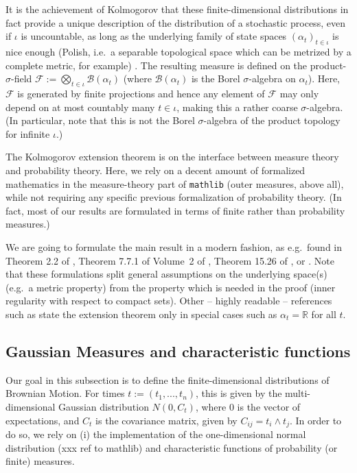 \documentclass[lean]{DraftAFM}
\begin{document}
It is the achievement of Kolmogorov that these finite-dimensional distributions in fact provide a unique description of the distribution of a stochastic process, even if $\iota$ is uncountable, as long as the underlying family of state spaces $(\alpha_t)_{t\in\iota}$ is nice enough (Polish, i.e.\ a separable topological space which can be metrized by a complete metric, for example) \cite{kolmogoroff1933grundbegriffe}.
The resulting measure is defined on the product-$\sigma$-field $\mathcal F :=\bigotimes_{t\in\iota} \mathcal B(\alpha_t)$ (where $\mathcal B(\alpha_t)$ is the Borel $\sigma$-algebra on $\alpha_t$). Here, $\mathcal F$ is generated by finite projections and hence any element of $\mathcal F$ may only depend on at most countably many $t\in \iota$, making this a rather coarse $\sigma$-algebra. (In particular, note that this is not the Borel $\sigma$-algebra of the product topology for infinite $\iota$.)

The Kolmogorov extension theorem is on the interface between measure theory and probability theory. Here, we rely on a decent amount of formalized mathematics in the measure-theory part of {\tt mathlib} (outer measures, above all), while not requiring any specific previous formalization of probability theory. (In fact, most of our results are formulated in terms of finite rather than probability measures.)

We are going to formulate the main result in a modern fashion, as e.g.\ found in Theorem 2.2 of \cite{rao1971projective}, Theorem 7.7.1 of Volume~2 of \cite{bogachev2007measure}, Theorem 15.26 of \cite{guide2006infinite}, or \cite{border1998expository}. Note that these formulations split general assumptions on the underlying space(s) (e.g.\ a metric property) from the property which is needed in the proof (inner regularity with respect to compact sets). Other -- highly readable -- references such as \cite{Billingsley1995} state the extension theorem only in special cases such as $\alpha_t = \mathbb R$ for all $t$.


\subsection{Gaussian Measures and characteristic functions}
Our goal in this subsection is to define the finite-dimensional distributions of Brownian Motion. For times $t := (t_1, ..., t_n)$, this is given by the multi-dimensional Gaussian distribution $N(0, C_t)$, where $0$ is the vector of expectations, and $C_t$ is the covariance matrix, given by $C_{ij} = t_i \wedge t_j$. In order to do so, we rely on (i) the implementation of the one-dimensional normal distribution (xxx ref to mathlib) and characteristic functions of probability (or finite) measures.
\end{document}
